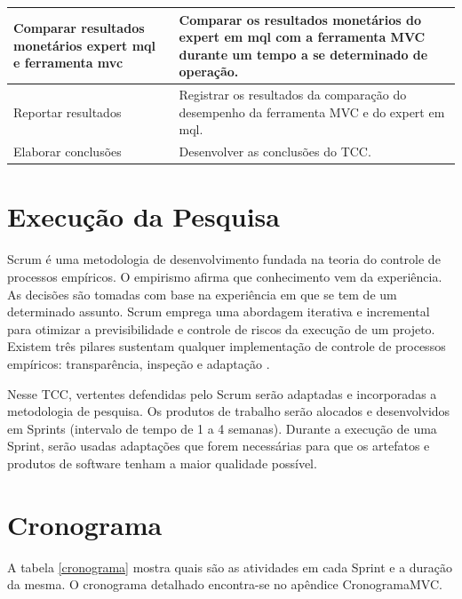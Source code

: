 \begin{table}[htp]
\begin{center}
\begin{tabular}{ | p{5cm} | p{9cm} |}
	Comparar resultados monetários expert mql e ferramenta mvc & Comparar os resultados monetários do expert em mql com a ferramenta MVC durante um tempo a se determinado de operação.\\ \hline
	Reportar resultados & Registrar os resultados da comparação do desempenho da ferramenta MVC e do expert em mql.\\ \hline
	Elaborar conclusões & Desenvolver as conclusões do TCC.\\ \hline
    \end{tabular}
    \end{center}
\label{atividadeMetologia}
\end{table}

\section{Execução da Pesquisa}

Scrum é uma metodologia de desenvolvimento fundada na teoria do controle de processos empíricos. O empirismo afirma que conhecimento vem da experiência. As decisões são tomadas com base na experiência em que se tem de um determinado assunto. Scrum emprega uma abordagem iterativa e incremental para otimizar a previsibilidade e controle de riscos da execução de um projeto. Existem três pilares sustentam qualquer implementação de controle de processos empíricos: transparência, inspeção e adaptação \cite[pág.~4]{schwaber2013}.

Nesse TCC, vertentes defendidas pelo Scrum serão adaptadas e incorporadas a metodologia de pesquisa. Os produtos de  trabalho serão alocados e desenvolvidos em Sprints (intervalo de tempo de 1 a 4 semanas). Durante a execução de uma Sprint, serão usadas adaptações que forem necessárias para que os artefatos e  produtos de software tenham a maior qualidade possível.

\section{Cronograma}

A tabela \ref{cronograma} mostra quais são as atividades em cada Sprint e a duração da mesma. O cronograma detalhado encontra-se no apêndice CronogramaMVC.

